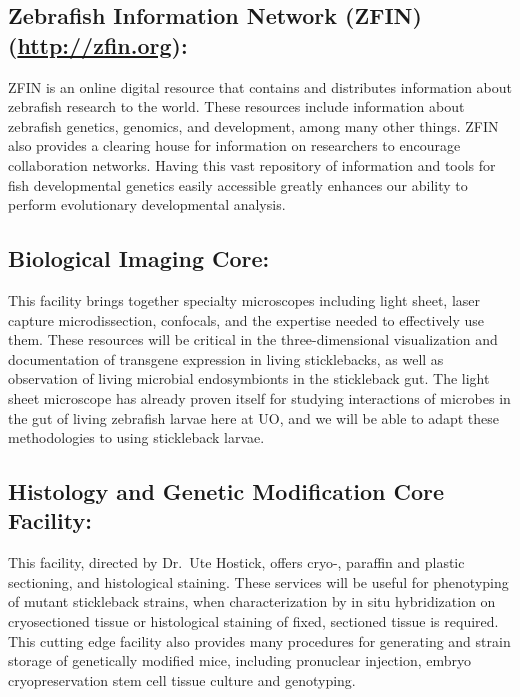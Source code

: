 \documentclass[
]{book}
\begin{document}
\hypertarget{zebrafish-information-network-zfin-httpzfin.org}{%
\subsection{\texorpdfstring{Zebrafish Information Network (ZFIN) (\url{http://zfin.org}):}{Zebrafish Information Network (ZFIN) (http://zfin.org):}}\label{zebrafish-information-network-zfin-httpzfin.org}}

ZFIN is an online digital resource that contains and distributes information about zebrafish research to the world. These resources include information about zebrafish genetics, genomics, and development, among many other things. ZFIN also provides a clearing house for information on researchers to encourage collaboration networks. Having this vast repository of information and tools for fish developmental genetics easily accessible greatly enhances our ability to perform evolutionary developmental analysis.

\hypertarget{biological-imaging-core}{%
\subsection{Biological Imaging Core:}\label{biological-imaging-core}}

This facility brings together specialty microscopes including light sheet, laser capture microdissection, confocals, and the expertise needed to effectively use them. These resources will be critical in the three-dimensional visualization and documentation of transgene expression in living sticklebacks, as well as observation of living microbial endosymbionts in the stickleback gut. The light sheet microscope has already proven itself for studying interactions of microbes in the gut of living zebrafish larvae here at UO, and we will be able to adapt these methodologies to using stickleback larvae.

\hypertarget{histology-and-genetic-modification-core-facility}{%
\subsection{Histology and Genetic Modification Core Facility:}\label{histology-and-genetic-modification-core-facility}}

This facility, directed by Dr.~Ute Hostick, offers cryo-, paraffin and plastic sectioning, and histological staining. These services will be useful for phenotyping of mutant stickleback strains, when characterization by in situ hybridization on cryosectioned tissue or histological staining of fixed, sectioned tissue is required. This cutting edge facility also provides many procedures for generating and strain storage of genetically modified mice, including pronuclear injection, embryo cryopreservation stem cell tissue culture and genotyping.
\end{document}
